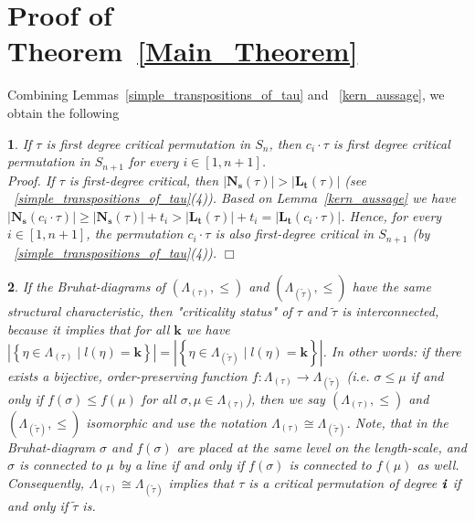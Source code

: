 \documentclass[a4 paper,12pt]{article}
\DeclareMathOperator{\Bruh}{\leqslant}
\newtheorem{numeris}{}[section]
\begin{document}
\section{\textbf{Proof of Theorem}~\ref{Main_Theorem}}
\label{proof_main_Theorem}

Combining Lemmas~\ref{simple_transpositions_of_tau} and ~\ref{kern_aussage}, we obtain the following 

	\begin{numeris} \textit{If $\tau$ is first degree critical permutation in $S_n$, then $c_i\cdot  \tau$ 
is  first degree critical permutation in $S_{n+1}$ for every  $i\in \left[1, n+1\right]$.}\\ 

\textit{Proof.} If $\tau$ is first-degree critical, then  $\left|\textbf{N}_{\textbf{s}}( \tau)\right| > \left|\textbf{L}_{\textbf{t}}( \tau)\right|$ (see ~\ref{simple_transpositions_of_tau}(4)). Based on Lemma~\ref{kern_aussage} we have 
$\left|\textbf{N}_{\textbf{s}}(c_i\cdot  \tau)\right| \geq \left|\textbf{N}_{\textbf{s}}( \tau)\right| + t_i > \left|\textbf{L}_{\textbf{t}}( \tau)\right| + t_i = \left|\textbf{L}_{\textbf{t}}( c_i\cdot \tau)\right| $. Hence, for every $i \in [1,n+1]$, the permutation $c_i \cdot \tau$ 
is also first-degree critical in $S_{n+1}$   (by ~\ref{simple_transpositions_of_tau}(4)). 
\hfill $\Box$ 
	\label{proof_of_the_second_part}
\end{numeris}




 \begin{numeris} If the Bruhat-diagrams of $\left(\Lambda_{(\tau)}, \Bruh \right)$ and $\left(\Lambda_{(\widetilde{\tau})}, \Bruh \right)$  have the same structural characteristic, then  "\textit{criticality status}" of $\tau$ and $\widetilde{\tau}$ is interconnected, because it implies that for all $\textbf{k}$ we have  $\left|\left\{\eta\in \Lambda_{(\tau)} \mid l(\eta)=\textbf{k}\right\}\right| = \left|\left\{\eta\in \Lambda_{(\widetilde{\tau})} \mid l(\eta)=\textbf{k}\right\}\right| $. In other words: if there exists a bijective, order-preserving function $f:\Lambda_{(\tau)} \to \Lambda_{(\widetilde{\tau})}$  (i.e. $\sigma \Bruh \mu$ if and only if $f(\sigma)\Bruh f(\mu)$ for all $\sigma,\mu\in \Lambda_{(\tau)}$), then we say $\left(\Lambda_{(\tau)}, \Bruh \right)$ and $\left(\Lambda_{(\widetilde{\tau})}, \Bruh \right)$ \textit{isomorphic} and use the notation $\Lambda_{(\tau)} \cong \Lambda_{(\widetilde{\tau})}$. Note, that in the Bruhat-diagram  $\sigma $ and $f(\sigma)$ are placed at the same level on the length-scale,   and   $\sigma $ is connected to $ \mu$ by a line if and only if $f(\sigma) $ is connected to $f(\mu)$ as well. Consequently, $\Lambda_{(\tau)} \cong \Lambda_{(\widetilde{\tau})}$ implies that $\tau$ is a critical permutation of degree $\textbf{\textit{i}}$ if and only if $\widetilde{\tau}$ is. 
 \label{isomorph}
\end{numeris}
\end{document}
